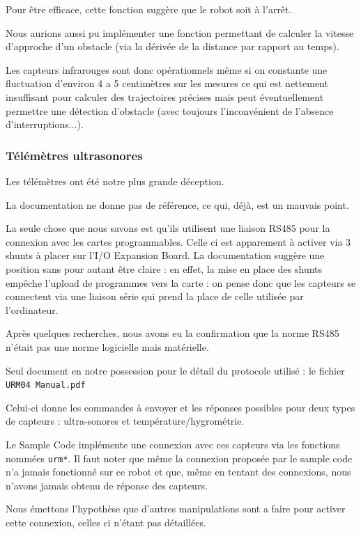 \documentclass[a4paper]{report}
\begin{document}
Pour être efficace, cette fonction suggère que le robot soit à l'arrêt.

Nous aurions aussi pu implémenter une fonction permettant de calculer la vitesse d'approche d'un obstacle (via la dérivée de la distance par rapport au temps).

Les capteurs infrarouges sont donc opérationnels même si on constante une fluctuation d'environ 4 a 5 centimètres sur les mesures ce qui est nettement insuffisant pour calculer des trajectoires précises mais peut éventuellement permettre une détection d'obstacle (avec toujours l'inconvénient de l'absence d'interruptions...).


\subsubsection{Télémètres ultrasonores%
  \label{telemetres-ultrasonores}%
}

Les télémètres ont été notre plus grande déception.

La documentation ne donne pas de référence, ce qui, déjà, est un mauvais point.

La seule chose que nous savons est qu'ils utilisent une liaison RS485 pour la connexion avec les cartes programmables.
Celle ci est apparement à activer via 3 shunts à placer sur l'I/O Expansion Board. La documentation suggère une position sans pour autant être claire : en effet, la mise en place des shunts empêche l'upload de programmes vers la carte : on pense donc que les capteurs se connectent via une liaison série qui prend la place de celle utilisée par l'ordinateur.

Après quelques recherches, nous avons eu la confirmation que la norme RS485 n'était pas une norme logicielle mais matérielle.

Seul document en notre possession pour le détail du protocole utilisé : le fichier \texttt{URM04 Manual.pdf}

Celui-ci donne les commandes à envoyer et les réponses possibles pour deux types de capteurs : ultra-sonores et température/hygrométrie.

Le Sample Code implémente une connexion avec ces capteurs via les fonctions nommées \texttt{urm*}.
Il faut noter que même la connexion proposée par le sample code n'a jamais fonctionné sur ce robot et que, même en tentant des connexions, nous n'avons jamais obtenu de réponse des capteurs.

Nous émettons l'hypothèse que d'autres manipulations sont a faire pour activer cette connexion, celles ci n'étant pas détaillées.
\end{document}
